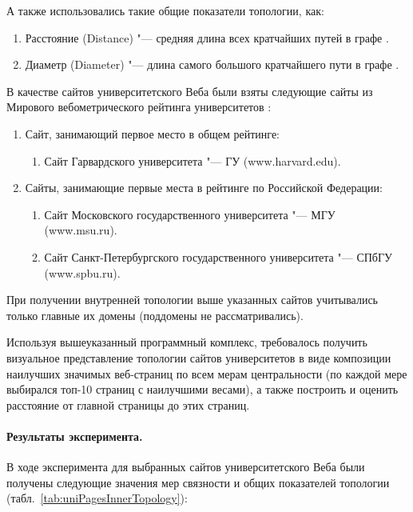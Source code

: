 А также использовались такие общие показатели топологии, как:
\begin{enumerate}
	\item Расстояние (Distance) "--- средняя длина всех кратчайших путей в графе \cite{MaksimovBlekanov}. 
	\item Диаметр (Diameter) "--- длина самого большого кратчайшего пути в графе \cite{MaksimovBlekanov}.
\end{enumerate}

В качестве сайтов университетского Веба были взяты следующие сайты из Мирового вебометрического рейтинга университетов \cite{RankingWeb}:
\begin{enumerate}
	\item Сайт, занимающий первое место в общем рейтинге:
		\begin{enumerate}
				\item Сайт Гарвардского университета "--- ГУ (www.harvard.edu). 
			\end{enumerate}
	\item Сайты, занимающие первые места в рейтинге по Российской Федерации: 
		\begin{enumerate}
				\item Сайт Московского государственного университета "--- МГУ (www.msu.ru). 
				\item Сайт Санкт-Петербургского государственного университета "--- СПбГУ (www.spbu.ru).
			\end{enumerate}
\end{enumerate}

При получении внутренней топологии выше указанных сайтов учитывались только главные их домены (поддомены не рассматривались). 

Используя вышеуказанный программный комплекс, требовалось получить визуальное представление топологии сайтов университетов в виде композиции наилучших значимых веб-страниц по всем мерам центральности (по каждой мере выбирался топ-10 страниц с наилучшими весами), а также построить и оценить расстояние от главной страницы до этих страниц.

\paragraph{Результаты эксперимента.} В ходе эксперимента для выбранных сайтов университетского Веба были получены следующие значения мер связности и общих показателей топологии (табл.~\cref{tab:uniPagesInnerTopology}):

